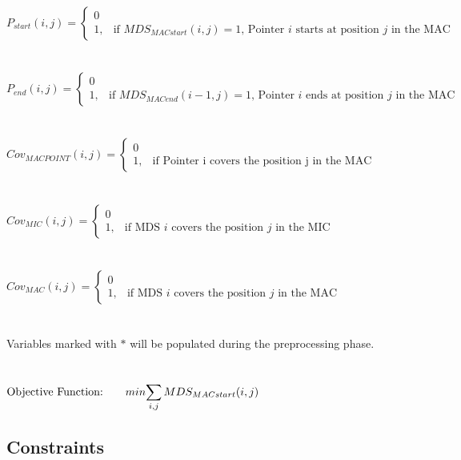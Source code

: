 $P_{start}(i,j) = \begin{cases} 0 \\ 1, & \mbox{if } MDS_{MACstart}(i,j) = 1 \mbox{, Pointer } i \mbox{ starts at position } j \mbox{ in the MAC} \end{cases}$ \\\\\\
$P_{end}(i,j) = \begin{cases} 0 \\ 1, & \mbox{if } MDS_{MACend}(i-1,j) = 1 \mbox{, Pointer } i \mbox{ ends at position } j \mbox{ in the MAC} \end{cases}$ \\\\\\
$Cov_{MACPOINT}(i,j) = \begin{cases} 0 \\ 1, & \mbox{if Pointer i covers the position j in the MAC} \end{cases}$ \\\\\\
$Cov_{MIC}(i,j) = \begin{cases} 0 \\ 1, & \mbox{if MDS } i\mbox{ covers the position } j \mbox{ in the MIC} \end{cases}$ \\\\\\
$Cov_{MAC}(i,j) = \begin{cases} 0 \\ 1, & \mbox{if MDS } i\mbox{ covers the position } j \mbox{ in the MAC} \end{cases}$ \\\\\\
Variables marked with $*$ will be populated during the preprocessing phase. \\\\\\

$\mbox{Objective Function:} \qquad min \mathlarger{\sum_{i,j} MDS_{MACstart}(i,j)}$

\subsection{Constraints}

